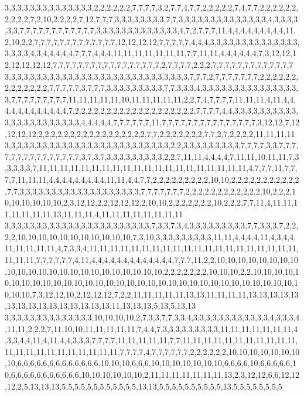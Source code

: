 3,3,3,3,3,3,3,3,3,3,3,3,3,3,2,2,2,2,2,2,7,7,7,7,3,2,7,7,4,7,7,2,2,2,2,2,7,4,7,7,2,2,2,2,2,2,2,2,2,2,7,2,10,2,2,2,2,7,12,7,7,7,3,3,3,3,3,3,3,3,7,7,3,3,3,3,3,3,3,3,3,3,3,3,3,3,4,3,3,3,3,3,3,7,7,7,7,7,7,7,7,7,7,7,7,3,3,3,3,3,3,3,3,3,3,3,3,3,4,7,2,7,7,7,11,4,4,4,4,4,4,4,4,4,11,2,10,2,2,7,7,7,7,7,7,7,7,7,7,7,7,7,12,12,12,12,7,7,7,7,7,4,4,4,3,3,3,3,3,3,3,3,3,3,3,3,3,3,3,3,3,3,4,3,4,4,4,4,4,7,7,7,4,4,4,11,11,11,11,11,11,11,7,7,11,11,4,4,4,4,4,4,7,3,12,12,12,12,12,12,12,7,7,7,7,7,7,7,7,7,7,7,7,7,7,7,7,7,2,7,7,7,7,2,2,2,7,7,7,7,7,7,7,7,7,7,7,7,7
3,3,3,3,3,3,3,3,3,3,3,3,3,3,3,3,3,3,3,3,3,3,3,3,3,3,3,3,3,7,7,7,2,7,7,7,7,7,7,7,2,2,2,2,2,2,2,2,2,2,2,2,2,7,7,7,7,7,3,7,7,7,3,3,3,3,3,3,3,3,3,7,7,3,3,3,4,3,3,3,3,3,3,3,3,3,3,3,3,3,3,3,3,7,7,7,7,7,7,7,7,7,11,11,11,11,11,10,11,11,11,11,11,2,2,7,4,7,7,7,7,11,11,11,4,11,4,4,4,4,4,4,4,4,4,4,4,4,7,2,2,2,2,2,2,2,2,2,2,2,2,2,2,2,2,2,2,2,7,7,7,7,4,4,3,3,3,3,3,3,3,3,3,3,3,3,3,3,3,3,3,3,3,3,3,3,4,4,4,4,4,7,7,7,7,7,7,11,7,7,7,7,7,7,7,7,7,7,7,7,7,7,7,3,12,12,7,12,12,12,12,2,2,2,2,2,2,2,2,2,2,2,2,2,2,2,2,2,7,7,2,2,2,2,2,2,2,7,7,2,7,2,2,2,2,11,11,11,11
3,3,3,3,3,3,3,3,3,3,3,3,3,3,3,3,3,3,3,3,3,3,3,3,3,3,2,2,3,3,3,3,3,3,3,3,3,7,7,7,7,3,3,7,7,7,7,7,7,7,7,7,7,7,7,7,7,7,3,7,3,7,3,3,3,3,3,3,3,3,3,2,2,7,11,11,4,4,4,4,7,11,11,10,11,11,7,3,3,3,3,3,7,11,11,11,11,11,11,11,11,11,11,11,11,11,11,11,11,11,11,11,11,4,7,7,7,11,7,7,7,7,11,11,11,4,4,4,4,4,4,4,4,4,11,11,4,4,7,7,2,2,2,2,2,2,2,2,2,10,10,2,2,2,2,2,2,2,2,2,2,2,7,7,3,3,3,3,3,3,3,3,3,3,3,3,3,3,3,3,3,3,3,7,7,7,7,7,7,7,2,2,2,2,2,2,2,2,2,2,2,2,10,2,2,2,10,10,10,10,10,10,2,3,12,12,2,2,12,12,12,2,10,10,2,2,2,2,2,2,2,10,2,2,2,7,7,11,4,11,11,11,11,11,11,11,13,11,11,11,4,11,11,11,11,11,11,11,11
3,3,3,3,3,3,3,3,3,3,3,3,3,3,3,3,3,3,3,3,3,3,3,7,3,3,7,3,4,3,3,3,3,3,3,3,3,3,7,7,3,3,3,7,2,2,2,2,10,10,10,10,10,10,10,10,10,10,10,7,3,10,3,3,3,3,3,3,3,3,3,11,11,4,4,4,4,11,4,3,4,4,11,11,11,11,11,4,7,3,3,4,11,11,11,11,11,11,11,11,11,11,11,11,11,11,11,11,11,11,11,11,11,11,11,7,7,7,7,7,7,4,11,4,4,4,4,4,4,4,4,4,4,4,4,4,7,7,7,11,2,2,10,10,10,10,10,10,10,10,10,10,10,10,10,10,10,10,10,10,10,10,10,10,10,2,2,2,2,2,2,2,10,10,10,2,2,10,10,10,10,10,10,10,10,10,10,10,10,10,10,10,10,10,10,10,10,10,10,10,10,10,10,10,10,10,10,10,10,10,10,10,7,3,12,12,10,2,12,12,12,7,2,2,11,11,11,11,11,13,13,11,11,11,11,13,13,13,13,13,13,13,13,13,13,13,13,13,13,13,11,13,13,13,5,13,5,13,13
3,3,3,3,3,3,3,3,3,3,3,3,3,3,10,10,10,10,2,7,3,3,7,7,3,3,4,3,3,3,3,3,3,3,3,3,3,3,3,4,3,3,3,4,11,11,2,2,2,7,11,10,10,11,11,11,11,11,7,4,4,7,3,3,3,3,3,3,3,3,3,11,11,11,11,11,11,11,4,3,3,4,4,11,4,11,4,4,3,3,3,7,7,7,7,11,11,11,11,11,7,7,11,11,11,11,11,11,11,11,11,11,11,11,11,11,11,11,11,11,11,11,11,11,7,7,7,7,4,7,7,7,7,7,7,2,2,2,2,2,2,10,10,10,10,10,10,10,10,6,6,6,6,6,6,6,6,6,6,6,6,6,10,10,10,6,6,6,10,10,10,10,10,10,10,6,6,6,6,10,6,6,6,6,6,10,6,6,6,6,6,6,6,6,6,6,6,10,10,10,10,10,10,2,11,11,11,11,11,11,11,13,2,3,12,12,6,6,12,12,12,2,5,13,13,13,5,5,5,5,5,5,5,5,5,5,5,5,13,13,5,5,5,5,5,5,5,5,5,5,13,5,5,5,5,5,5,5,5
